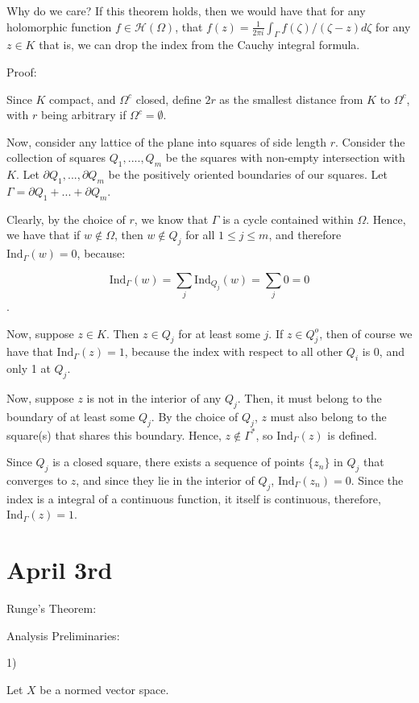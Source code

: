 \documentclass[10pt]{article}
\newcommand{\calH}{\mathcal{H}}
\newcommand{\ind}{\text{Ind}}
\begin{document}
Why do we care? If this theorem holds, then we would have that for any holomorphic function $f \in \calH(\Omega)$, that $f(z) = \frac{1}{2\pi i} \int_\Gamma f(\zeta)/(\zeta - z) d\zeta$ for any $z \in K$ that is, we can drop the index from the Cauchy integral formula.

Proof:

Since $K$ compact, and $\Omega^c$ closed, define $2r$ as the smallest distance from $K$ to $\Omega^c$, with $r$ being arbitrary if $\Omega^c = \emptyset$. 

Now, consider any lattice of the plane into squares of side length $r$. Consider the collection of squares $Q_1,....,Q_m$ be the squares with non-empty intersection with $K$. Let $\partial Q_1,...,\partial Q_m$ be the positively oriented boundaries of our squares. Let $\Gamma = \partial Q_1 + ... + \partial Q_m$.

Clearly, by the choice of $r$, we know that $\Gamma$ is a cycle contained within $\Omega$. Hence, we have that if $w \not \in \Omega$, then $w \not \in Q_j$ for all $1 \leq j \leq m$, and therefore $\ind_\Gamma(w) = 0$, because:

$$ \ind_\Gamma(w) = \sum_j \ind_{Q_j}(w) = \sum_j 0 = 0$$.

Now, suppose $z \in K$. Then $z \in Q_j$ for at least some $j$. If $z \in Q_j^o$, then of course we have that $\ind_\Gamma(z) = 1$, because the index with respect to all other $Q_i$ is 0, and only 1 at $Q_j$. 

Now, suppose $z$ is not in the interior of any $Q_j$. Then, it must belong to the boundary of at least some $Q_j$. By the choice of $Q_j$, $z$ must also belong to the square(s) that shares this boundary. Hence, $z \not \in \Gamma^*$, so $\ind_\Gamma(z)$ is defined. 

Since $Q_j$ is a closed square, there exists a sequence of points $\{ z_n \}$ in $Q_j$ that converges to $z$, and since they lie in the interior of $Q_j$, $\ind_\Gamma(z_n) = 0$. Since the index is a integral of a continuous function, it itself is continuous, therefore, $\ind_\Gamma(z) = 1$.

\section*{April 3rd}

Runge’s Theorem:

Analysis Preliminaries:

1)

Let $X$ be a normed vector space. 
\end{document}
